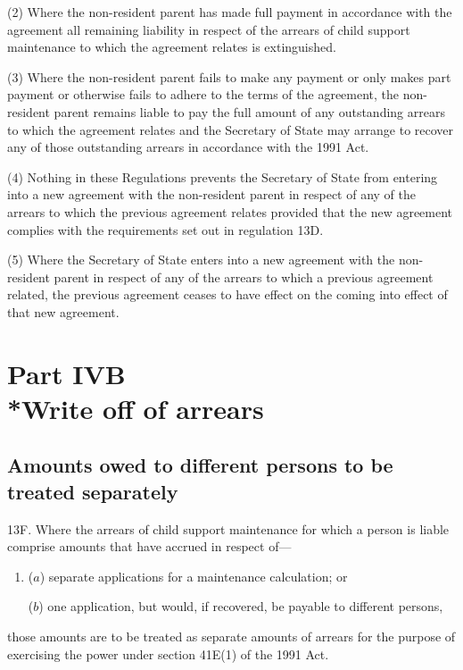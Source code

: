 \documentclass[12pt,a4paper]{article}
\begin{document}
(2) Where the non-resident parent has made full payment in accordance with the agreement all remaining liability in respect of the arrears of child support maintenance to which the agreement relates is extinguished.

(3) Where the non-resident parent fails to make any payment or only makes part payment or otherwise fails to adhere to the terms of the agreement, the non-resident parent remains liable to pay the full amount of any outstanding arrears to which the agreement relates and the Secretary of State may arrange to recover any of those outstanding arrears in accordance with the 1991 Act.

(4) Nothing in these Regulations prevents the Secretary of State from entering into a new agreement with the non-resident parent in respect of any of the arrears to which the previous agreement relates provided that the new agreement complies with the requirements set out in regulation 13D.

(5) Where the Secretary of State enters into a new agreement with the non-resident parent in respect of any of the arrears to which a previous agreement related, the previous agreement ceases to have effect on the coming into effect of that new agreement.

\section[Part IVB --- Write off of arrears]{Part IVB\\*Write off of arrears}

\renewcommand\parthead{--- Part IVB}


\subsection[13F. Amounts owed to different persons to be treated separately]{Amounts owed to different persons to be treated separately}

13F.  Where the arrears of child support maintenance for which a person is liable comprise amounts that have accrued in respect of—
\begin{enumerate}\item[]
($a$) separate applications for a maintenance calculation; or

($b$) one application, but would, if recovered, be payable to different persons,
\end{enumerate}
those amounts are to be treated as separate amounts of arrears for the purpose of exercising the power under section 41E(1) of the 1991 Act.
\end{document}
